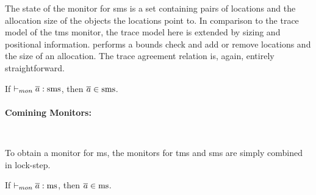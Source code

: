 \documentclass[utf8,acmsmall,review,screen,dvipsnames]{acmart}
\begin{document}
The state of the monitor for \gls{sms} is a set containing pairs of locations and the allocation size of the objects the locations point to.
In comparison to the trace model of the \gls{tms} monitor, the trace model here is extended by sizing and positional information.
 performs a bounds check and  add or remove locations and the size of an allocation.
The trace agreement relation is, again, entirely straightforward.

\begin{lemma}\label{lem:mon:smsafe}
  If $\vdash_{mon}{\overline{a}}:{\operatorname{sms}}$, then $\overline{a}\in\operatorname{sms}$.\Coqed
\end{lemma}

\paragraph{Comining Monitors: }

\begin{center}
  $\;$\\
\end{center}
\begin{center}
  $\;$\\
\end{center}

To obtain a monitor for \gls{ms}, the monitors for \gls{tms} and \gls{sms} are simply combined in lock-step.

\begin{lemma}\label{lem:mon:msafe}
  If $\vdash_{mon}{\overline{a}}:{\operatorname{ms}}$, then $\overline{a}\in\operatorname{ms}$.\Coqed
\end{lemma}
\end{document}
